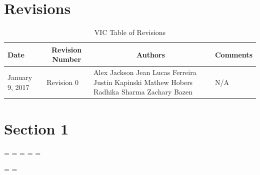 \documentclass [10pt]{article}
\begin{document}
\section{Revisions}
\begin{longtable}{| p{ } | p{ } | p{ } | p{ } |} \caption{VIC Table of Revisions}  \\

\hline 
\centering \textbf{Date} & 
\multicolumn{1}{c}{\textbf {Revision Number}} &
\multicolumn{1}{|c}{\textbf {Authors}} & 
\multicolumn{1}{|c|}{\textbf {Comments}} \\ \hline

\multirow{4}{*}{\centering January 9, 2017}  & 
\multirow{4}{*}{Revision 0}& 
{Alex Jackson \newline
Jean Lucas Ferreira \newline
Justin Kapinski\newline
Mathew Hobers\newline
Radhika Sharma\newline
Zachary Bazen}
&
 \multirow{4}{*}{N/A} \\ 
\hline 


\end{longtable}
\pagebreak


\section {Section 1}

%

\lipsum[1]



\newpage


\paperwidth=\pdfpageheight
\paperheight=\pdfpagewidth
\pdfpageheight=\paperheight
\pdfpagewidth=\paperwidth
\headwidth=\textheight

\begingroup
 
\vsize=\textwidth
\hsize=\textheight
\end{document}
